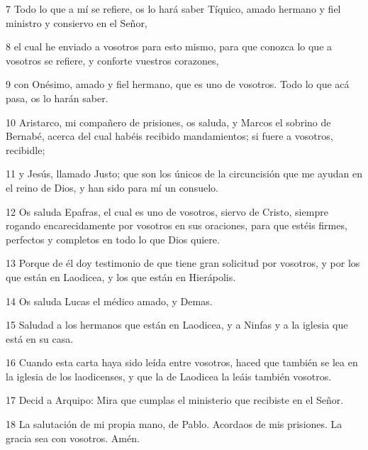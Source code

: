 \par 7 Todo lo que a mí se refiere, os lo hará saber Tíquico, amado hermano y fiel ministro y consiervo en el Señor,
\par 8 el cual he enviado a vosotros para esto mismo, para que conozca lo que a vosotros se refiere, y conforte vuestros corazones,
\par 9 con Onésimo, amado y fiel hermano, que es uno de vosotros. Todo lo que acá pasa, os lo harán saber.
\par 10 Aristarco, mi compañero de prisiones, os saluda, y Marcos el sobrino de Bernabé, acerca del cual habéis recibido mandamientos; si fuere a vosotros, recibidle;
\par 11 y Jesús, llamado Justo; que son los únicos de la circuncisión que me ayudan en el reino de Dios, y han sido para mí un consuelo.
\par 12 Os saluda Epafras, el cual es uno de vosotros, siervo de Cristo, siempre rogando encarecidamente por vosotros en sus oraciones, para que estéis firmes, perfectos y completos en todo lo que Dios quiere.
\par 13 Porque de él doy testimonio de que tiene gran solicitud por vosotros, y por los que están en Laodicea, y los que están en Hierápolis.
\par 14 Os saluda Lucas el médico amado, y Demas.
\par 15 Saludad a los hermanos que están en Laodicea, y a Ninfas y a la iglesia que está en su casa.
\par 16 Cuando esta carta haya sido leída entre vosotros, haced que también se lea en la iglesia de los laodicenses, y que la de Laodicea la leáis también vosotros.
\par 17 Decid a Arquipo: Mira que cumplas el ministerio que recibiste en el Señor.
\par 18 La salutación de mi propia mano, de Pablo. Acordaos de mis prisiones. La gracia sea con vosotros. Amén.


